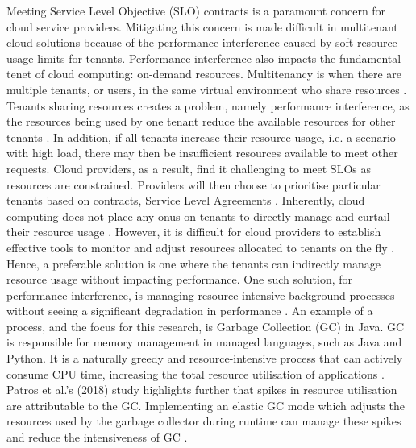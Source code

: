 Meeting Service Level Objective (SLO) contracts is a paramount concern for cloud service providers. Mitigating this concern is made difficult in multitenant cloud solutions because of the performance interference caused by soft resource usage limits for tenants. Performance interference also impacts the fundamental tenet of cloud computing: on-demand resources.
\newline\newline
Multitenancy is when there are multiple tenants, or users, in the same virtual environment who share resources \cite{dillon2010cloud}. Tenants sharing resources creates a problem, namely performance
interference, as the resources being used by one tenant reduce the available resources for other tenants \cite{mishra2013cloud}. In addition, if all tenants increase their resource usage, i.e. a
scenario with high load, there may then be insufficient resources
available to meet other requests. Cloud providers, as a result,  find it
challenging to meet SLOs as resources are constrained. Providers will then choose to prioritise particular tenants based on contracts, Service Level Agreements \cite{ru2014software}. 
\newline\newline
Inherently, cloud computing does not place any onus on tenants to
directly manage and curtail their resource usage  \cite{mell2011nist}. However, it is difficult for cloud providers to establish effective tools to monitor and adjust resources allocated to tenants on the fly \cite{gong2010press}.  Hence, a preferable solution is one where the tenants can indirectly manage resource usage without impacting performance. One such solution, for performance interference, is
managing resource-intensive background processes without seeing a
significant degradation in performance \cite{maas2014case}.  An example of a process, and the focus for this research, is Garbage Collection (GC) in Java.
\newline\newline
GC is responsible for memory management in managed languages, such as Java and Python. It is a naturally greedy and resource-intensive process that can actively consume CPU time, increasing the total resource utilisation of applications \cite{maas2016grail}. Patros et al.'s (2018) study highlights further that spikes in resource
utilisation are attributable to the GC. Implementing an elastic GC mode which adjusts the resources used by the garbage collector during runtime can manage these spikes and reduce the intensiveness of GC \cite{patros2018resource}.
